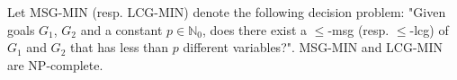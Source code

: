 \begin{theorem}\label{thm-dataflow-np-complete}
	Let MSG-MIN (resp. LCG-MIN) denote the following decision problem: "Given goals $G_1$, $G_2$ and a constant $p\in \mathbb{N}_0$, does there exist a $\leqslant$-msg (resp. $\leqslant$-lcg) of $G_1$ and $G_2$ that has less than $p$ different variables?". MSG-MIN and LCG-MIN are NP-complete.
\end{theorem}
%	
%	
%	
